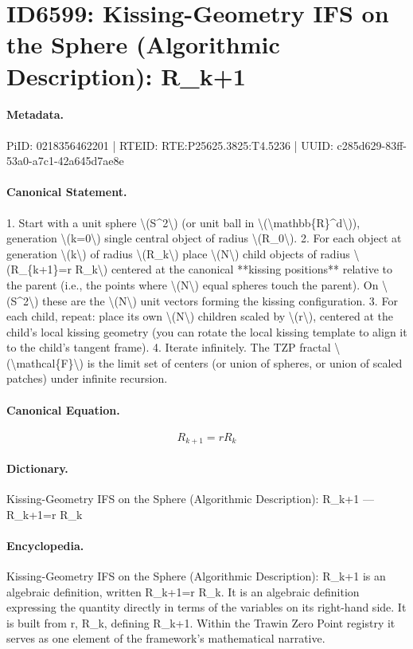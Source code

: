 \section*{ID6599: Kissing-Geometry IFS on the Sphere (Algorithmic Description): R\_k+1}
\paragraph{Metadata.}
PiID: 0218356462201 | RTEID: RTE:P25625.3825:T4.5236 | UUID: c285d629-83ff-53a0-a7c1-42a645d7ae8e

\paragraph{Canonical Statement.}
1. Start with a unit sphere \textbackslash{}(S\textasciicircum{}2\textbackslash{}) (or unit ball in \textbackslash{}(\textbackslash{}mathbb\{R\}\textasciicircum{}d\textbackslash{})), generation \textbackslash{}(k=0\textbackslash{}) single central object of radius \textbackslash{}(R\_0\textbackslash{}). 2. For each object at generation \textbackslash{}(k\textbackslash{}) of radius \textbackslash{}(R\_k\textbackslash{}) place \textbackslash{}(N\textbackslash{}) child objects of radius \textbackslash{}(R\_\{k+1\}=r R\_k\textbackslash{}) centered at the canonical **kissing positions** relative to the parent (i.e., the points where \textbackslash{}(N\textbackslash{}) equal spheres touch the parent). On \textbackslash{}(S\textasciicircum{}2\textbackslash{}) these are the \textbackslash{}(N\textbackslash{}) unit vectors forming the kissing configuration. 3. For each child, repeat: place its own \textbackslash{}(N\textbackslash{}) children scaled by \textbackslash{}(r\textbackslash{}), centered at the child’s local kissing geometry (you can rotate the local kissing template to align it to the child’s tangent frame). 4. Iterate infinitely. The TZP fractal \textbackslash{}(\textbackslash{}mathcal\{F\}\textbackslash{}) is the limit set of centers (or union of spheres, or union of scaled patches) under infinite recursion.

\paragraph{Canonical Equation.}
\[
R_{k+1}=r R_k
\]

\paragraph{Dictionary.}
Kissing-Geometry IFS on the Sphere (Algorithmic Description): R\_k+1 — R\_k+1=r R\_k

\paragraph{Encyclopedia.}
Kissing-Geometry IFS on the Sphere (Algorithmic Description): R\_k+1 is an algebraic definition, written R\_k+1=r R\_k. It is an algebraic definition expressing the quantity directly in terms of the variables on its right-hand side. It is built from r, R\_k, defining R\_k+1. Within the Trawin Zero Point registry it serves as one element of the framework's mathematical narrative.
